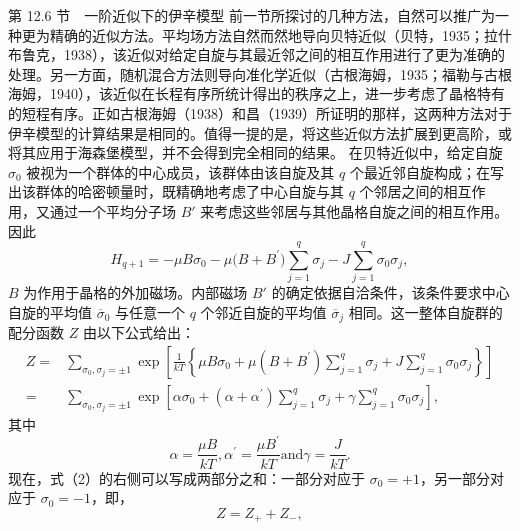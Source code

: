 第 12.6 节　一阶近似下的伊辛模型
前一节所探讨的几种方法，自然可以推广为一种更为精确的近似方法。平均场方法自然而然地导向贝特近似（贝特，1935；拉什布鲁克，1938），该近似对给定自旋与其最近邻之间的相互作用进行了更为准确的处理。另一方面，随机混合方法则导向准化学近似（古根海姆，1935；福勒与古根海姆，1940），该近似在长程有序所统计得出的秩序之上，进一步考虑了晶格特有的短程有序。正如古根海姆（1938）和昌（1939）所证明的那样，这两种方法对于伊辛模型的计算结果是相同的。值得一提的是，将这些近似方法扩展到更高阶，或将其应用于海森堡模型，并不会得到完全相同的结果。
在贝特近似中，给定自旋 \(\sigma_{0}\) 被视为一个群体的中心成员，该群体由该自旋及其 \(q\) 个最近邻自旋构成；在写出该群体的哈密顿量时，既精确地考虑了中心自旋与其 \(q\) 个邻居之间的相互作用，又通过一个平均分子场 \(B'\) 来考虑这些邻居与其他晶格自旋之间的相互作用。因此
\begin{equation}\tag{12.5.30}\label{eq:12.5.30}
H _ { q + 1 } = - \mu B \sigma _ { 0 } - \mu \Big ( B + B ^{\prime} \Big ) \sum _ { j = 1 } ^{q} \sigma _ { j } - J \sum _ { j = 1 } ^{q} \sigma _ { 0 } \sigma _ { j } ,
\end{equation}
\(B\) 为作用于晶格的外加磁场。内部磁场 \(B'\) 的确定依据自洽条件，该条件要求中心自旋的平均值 \(\overline{\sigma}_0\) 与任意一个 \(q\) 个邻近自旋的平均值 \(\overline{\sigma}_j\) 相同。这一整体自旋群的配分函数 \(Z\) 由以下公式给出：
\begin{equation}\tag{12.5.31}\label{eq:12.5.31}
\begin{array}{rl} { Z = } & { \sum _ { \sigma _ { 0 } , \sigma _ { j } = \pm 1 } \exp \left[ \frac { 1 } { k T } \left\{ \mu B \sigma _ { 0 } + \mu \left( B + B ^{\prime} \right) \sum _ { j = 1 } ^{q} \sigma _ { j } + J \sum _ { j = 1 } ^{q} \sigma _ { 0 } \sigma _ { j } \right\} \right] } \\{ = } & { \sum _ { \sigma _ { 0 } , \sigma _ { j } = \pm 1 } \exp \left[ \alpha \sigma _ { 0 } + \left( \alpha + \alpha ^{\prime} \right) \sum _ { j = 1 } ^{q} \sigma _ { j } + \gamma \sum _ { j = 1 } ^{q} \sigma _ { 0 } \sigma _ { j } \right] , } \end{array}
\end{equation}
其中
\begin{equation}\tag{12.5.32}\label{eq:12.5.32}
\alpha = \frac { \mu B } { k T } ,  \alpha ^{\prime} = \frac { \mu B ^{\prime} } { k T }  \mathrm { a n d }  \gamma = \frac { J } { k T } .
\end{equation}
现在，式（2）的右侧可以写成两部分之和：一部分对应于 \(\sigma_{0}=+1\)，另一部分对应于 \(\sigma_{0}=-1\)，即，
\begin{equation}\tag{12.5.33}\label{eq:12.5.33}
Z = Z _ { + } + Z _ { - } ,
\end{equation}
